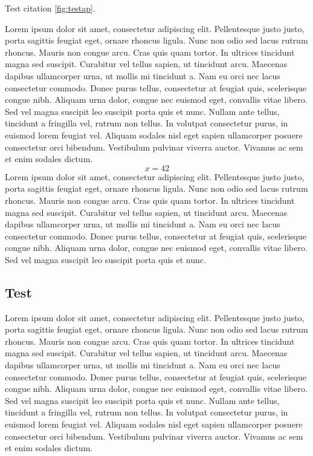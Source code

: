 \documentclass[letterpaper, twoside, 12pt, memoire, creativecommons, hyperref]{thETS}
\begin{document}
Test citation \ref{fig:testap}.

Lorem ipsum dolor sit amet, consectetur adipiscing elit. Pellentesque justo justo, porta sagittis feugiat eget, ornare rhoncus ligula. Nunc non odio sed lacus rutrum rhoncus. Mauris non congue arcu. Cras quis quam tortor. In ultrices tincidunt magna sed suscipit. Curabitur vel tellus sapien, ut tincidunt arcu. Maecenas dapibus ullamcorper urna, ut mollis mi tincidunt a. Nam eu orci nec lacus consectetur commodo. Donec purus tellus, consectetur at feugiat quis, scelerisque congue nibh. Aliquam urna dolor, congue nec euismod eget, convallis vitae libero. Sed vel magna suscipit leo suscipit porta quis et nunc. Nullam ante tellus, tincidunt a fringilla vel, rutrum non tellus. In volutpat consectetur purus, in euismod lorem feugiat vel. Aliquam sodales nisl eget sapien ullamcorper posuere consectetur orci bibendum. Vestibulum pulvinar viverra auctor. Vivamus ac sem et enim sodales dictum.
\begin{equation}
x = 42
\end{equation} 
Lorem ipsum dolor sit amet, consectetur adipiscing elit. Pellentesque justo justo, porta sagittis feugiat eget, ornare rhoncus ligula. Nunc non odio sed lacus rutrum rhoncus. Mauris non congue arcu. Cras quis quam tortor. In ultrices tincidunt magna sed suscipit. Curabitur vel tellus sapien, ut tincidunt arcu. Maecenas dapibus ullamcorper urna, ut mollis mi tincidunt a. Nam eu orci nec lacus consectetur commodo. Donec purus tellus, consectetur at feugiat quis, scelerisque congue nibh. Aliquam urna dolor, congue nec euismod eget, convallis vitae libero. Sed vel magna suscipit leo suscipit porta quis et nunc.

\subsection{Test}


Lorem ipsum dolor sit amet, consectetur adipiscing elit. Pellentesque justo justo, porta sagittis feugiat eget, ornare rhoncus ligula. Nunc non odio sed lacus rutrum rhoncus. Mauris non congue arcu. Cras quis quam tortor. In ultrices tincidunt magna sed suscipit. Curabitur vel tellus sapien, ut tincidunt arcu. Maecenas dapibus ullamcorper urna, ut mollis mi tincidunt a. Nam eu orci nec lacus consectetur commodo. Donec purus tellus, consectetur at feugiat quis, scelerisque congue nibh. Aliquam urna dolor, congue nec euismod eget, convallis vitae libero. Sed vel magna suscipit leo suscipit porta quis et nunc. Nullam ante tellus, tincidunt a fringilla vel, rutrum non tellus. In volutpat consectetur purus, in euismod lorem feugiat vel. Aliquam sodales nisl eget sapien ullamcorper posuere consectetur orci bibendum. Vestibulum pulvinar viverra auctor. Vivamus ac sem et enim sodales dictum.
\end{document}
